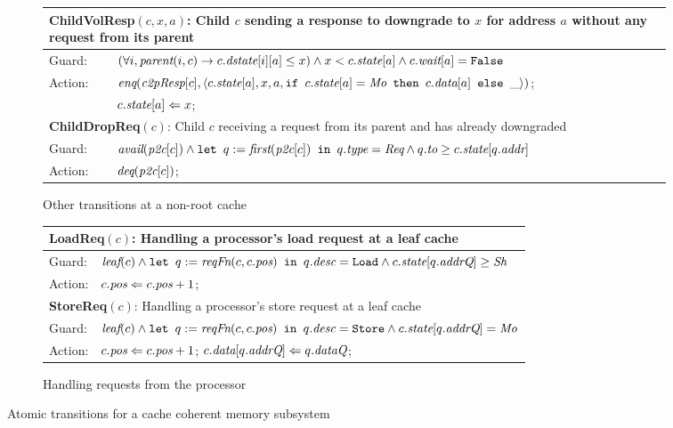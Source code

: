 \begin{figure}
\begin{subfigure}{\textwidth}
\centering
\begin{tabular}{|ll|}
\hline
\multicolumn{2}{|p{\textwidth}|}{\textbf{ChildVolResp}$(c, x, a)$: Child $c$ sending a response to downgrade to $x$ for address $a$ without any request from its parent}\\
\hline
Guard: & $(\forall i, \textit{parent}(i, c) \rightarrow c.\textit{dstate}[i][a] \le x) \wedge x < c.\textit{state}[a] \wedge c.\textit{wait}[a] = \texttt{False}$\\
\hline
Action: & $\enq(\cpResp[c], \langle c.\state[a], x, a,%
\myif c.\state[a] = \Mo \mythen c.\data[a] \myelse \_\rangle)$;\\
& $c.\textit{state}[a] \Leftarrow x$;\\
\hline
\hline
\multicolumn{2}{|p{\textwidth}|}{\textbf{ChildDropReq}$(c)$: Child $c$ receiving a request from its parent and has already downgraded}\\
\hline
Guard: & 
$\textit{avail}(\textit{p2c}[c]) \wedge \texttt{let } q := \textit{first}(\textit{p2c}[c]) \texttt{ in } q.\textit{type} = \textit{Req} \wedge q.\textit{to} \ge c.\textit{state}[q.\textit{addr}]$\\
\hline
Action: & $\textit{deq}(\textit{p2c}[c])$;\\
\hline
\end{tabular}
\caption{Other transitions at a non-root cache}
\label{childextra}
\end{subfigure}

\begin{subfigure}{\textwidth}
\centering
\begin{tabular}{|ll|}
\hline
\multicolumn{2}{|l|}{\textbf{LoadReq}$(c)$: Handling a processor's load request at a leaf cache}\\
\hline
Guard: & $\textit{leaf}(c) \wedge \texttt{let } q := \textit{reqFn}(c, c.\textit{pos}) \texttt{ in } q.\textit{desc} = \texttt{Load} \wedge c.\textit{state}[q.\textit{addrQ}] \ge \textit{Sh}$\\
\hline
Action:& $c.\textit{pos} \Leftarrow c.\textit{pos} + 1$;\\
\hline
\hline
\multicolumn{2}{|l|}{\textbf{StoreReq}$(c)$: Handling a processor's store request at a leaf cache}\\
\hline
Guard: & $\textit{leaf}(c) \wedge \texttt{let } q := \textit{reqFn}(c, c.\textit{pos}) \texttt{ in } q.\textit{desc} = \texttt{Store} \wedge c.\textit{state}[q.\textit{addrQ}] = \textit{Mo}$\\
\hline
\hline
Action:& $c.\textit{pos} \Leftarrow c.\textit{pos} + 1$; $c.\textit{data}[q.\textit{addrQ}] \Leftarrow q.\textit{dataQ}$;\\
\hline
\end{tabular}
\caption{Handling requests from the processor}
\label{procside}
\end{subfigure}
\caption{Atomic transitions for a cache coherent memory subsystem}
\label{trans}
\end{figure}

